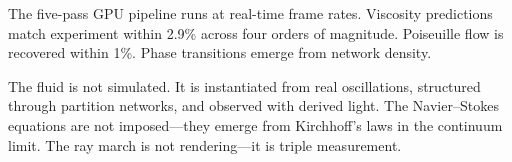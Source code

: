 \documentclass[twocolumn,10pt,a4paper]{article}
\theoremstyle{plain}
\theoremstyle{definition}
\theoremstyle{remark}
\begin{document}
The five-pass GPU pipeline runs at real-time frame rates. Viscosity predictions match experiment within 2.9\% across four orders of magnitude. Poiseuille flow is recovered within 1\%. Phase transitions emerge from network density.

The fluid is not simulated. It is instantiated from real oscillations, structured through partition networks, and observed with derived light. The Navier--Stokes equations are not imposed---they emerge from Kirchhoff's laws in the continuum limit. The ray march is not rendering---it is triple measurement.



\end{document}
